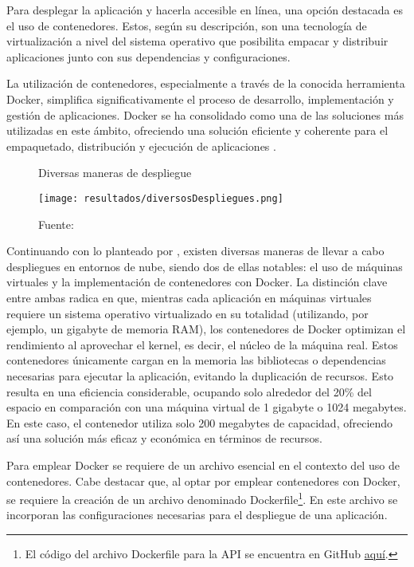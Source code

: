 Para desplegar la aplicación y hacerla accesible en línea, una opción destacada es el uso de contenedores. Estos, según su descripción, son una tecnología de virtualización a nivel del sistema operativo que posibilita empacar y distribuir aplicaciones junto con sus dependencias y configuraciones.

La utilización de contenedores, especialmente a través de la conocida herramienta Docker, simplifica significativamente el proceso de desarrollo, implementación y gestión de aplicaciones. Docker se ha consolidado como una de las soluciones más utilizadas en este ámbito, ofreciendo una solución eficiente y coherente para el empaquetado, distribución y ejecución de aplicaciones \citep{orovengua2016}.

\newpage


\begin{figure}[h]
	\centering
	\caption{Diversas maneras de despliegue}
	\texttt{[image: resultados/diversosDespliegues.png]}
	\caption*{\footnotesize Fuente: \cite{orovengua2016}}
	\label{fig:figuraDiversosDespliegues}
\end{figure}

Continuando con lo planteado por \cite{orovengua2016}, existen diversas maneras de llevar a cabo despliegues en entornos de nube, siendo dos de ellas notables: el uso de máquinas virtuales y la implementación de contenedores con Docker. La distinción clave entre ambas radica en que, mientras cada aplicación en máquinas virtuales requiere un sistema operativo virtualizado en su totalidad (utilizando, por ejemplo, un gigabyte de memoria RAM), los contenedores de Docker optimizan el rendimiento al aprovechar el kernel, es decir, el núcleo de la máquina real. Estos contenedores únicamente cargan en la memoria las bibliotecas o dependencias necesarias para ejecutar la aplicación, evitando la duplicación de recursos. Esto resulta en una eficiencia considerable, ocupando solo alrededor del 20\% del espacio en comparación con una máquina virtual de 1 gigabyte o 1024 megabytes. En este caso, el contenedor utiliza solo 200 megabytes de capacidad, ofreciendo así una solución más eficaz y económica en términos de recursos.

\newpage

Para emplear Docker se requiere de un archivo esencial en el contexto del uso de contenedores. Cabe destacar que, al optar por emplear contenedores con Docker, se requiere la creación de un archivo denominado Dockerfile\footnote{El código del archivo Dockerfile para la API se encuentra en GitHub \href{https://github.com/juferoto/mlops_project/tree/master/application/src}{aquí}.}. En este archivo se incorporan las configuraciones necesarias para el despliegue de una aplicación.



